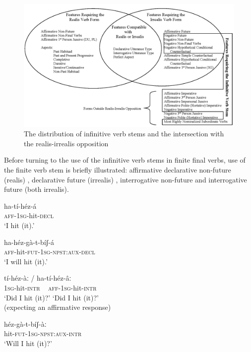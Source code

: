 \documentclass[output=paper]{langsci/langscibook}
\begin{document}
\begin{figure}
\includegraphics[width=\textwidth]{figures/MAhlandFig2.png}
\caption{The distribution of infinitive verb stems and the intersection with the realis-irrealis opposition}
\label{fig:2}
\end{figure}


Before turning to the use of the infinitive verb stems in finite final verbs, use of the finite verb stem is briefly illustrated: affirmative declarative non-future (realis) , declarative future (irrealis) , interrogative non-future  and interrogative future  (both irrealis).

\ea\label{ex:mahland:52}
\gll ha-tí-héz-{\downstep}á\\
\textsc{aff-1sg}{}-hit-\textsc{decl} \\
\glt `I hit (it).'
\z

\ea\label{ex:mahland:53}
\gll ha-héz-gà-t-bíʃ-á\\
\textsc{aff}{}-hit-\textsc{fut-1sg-npst:aux-decl} \\
\glt `I will hit (it).'
\z

\ea\label{ex:mahland:54}
\gll tí-héz-àː       /    ha-tí-héz-âː\\
\textsc{1sg}{}-hit-\textsc{intr}   ~  \textsc{aff-1sg}{}-hit-\textsc{intr}\\
\glt `Did I hit (it)?'      `Did I hit (it)?' \\
(expecting an affirmative response)
\z

\ea\label{ex:mahland:55}
\gll héz-gà-t-bíʃ-àː\\
hit-\textsc{fut-1sg-npst:aux-intr}\\
\glt `Will I hit (it)?'
\z
\end{document}
